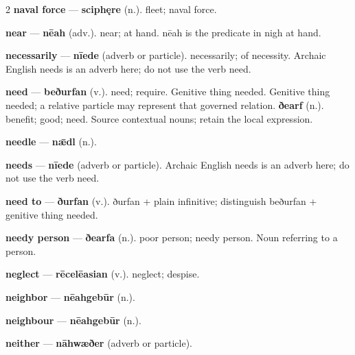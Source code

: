\begin{multicols}{2}
\textbf{naval force} — \textbf{sciphęre} (n.). fleet; naval force.\par
\textbf{near} — \textbf{nēah} (adv.). near; at hand. nēah is the predicate in nigh at hand.\par
\textbf{necessarily} — \textbf{nīede} (adverb or particle). necessarily; of necessity. Archaic English needs is an adverb here; do not use the verb need.\par
\textbf{need} — \textbf{beðurfan} (v.). need; require. Genitive thing needed. Genitive thing needed; a relative particle may represent that governed relation. \textbf{ðearf} (n.). benefit; good; need. Source contextual nouns; retain the local expression.\par
\textbf{needle} — \textbf{nǣdl} (n.).\par
\textbf{needs} — \textbf{nīede} (adverb or particle). Archaic English needs is an adverb here; do not use the verb need.\par
\textbf{need to} — \textbf{ðurfan} (v.). ðurfan + plain infinitive; distinguish beðurfan + genitive thing needed.\par
\textbf{needy person} — \textbf{ðearfa} (n.). poor person; needy person. Noun referring to a person.\par
\textbf{neglect} — \textbf{rēcelēasian} (v.). neglect; despise.\par
\textbf{neighbor} — \textbf{nēahgebūr} (n.).\par
\textbf{neighbour} — \textbf{nēahgebūr} (n.).\par
\textbf{neither} — \textbf{nāhwæðer} (adverb or particle).\par

\end{multicols}
